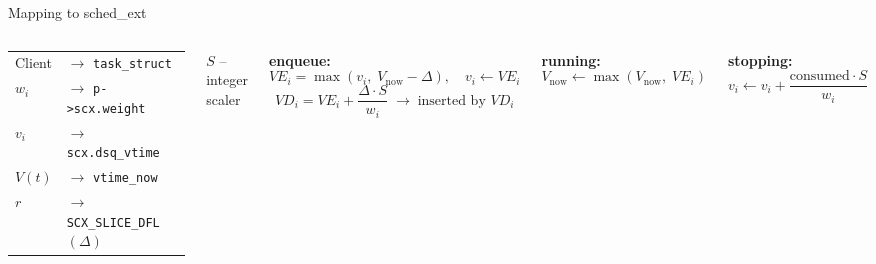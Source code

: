 \documentclass[aspectratio=169]{beamer}
\begin{document}
\begin{frame}{Mapping to sched\_ext}
        \begin{columns}
                \begin{tabular}{ll}
                        Client  & $\to$ \texttt{task\_struct} \\[2pt]
                        $w_i$   & $\to$ \texttt{p->scx.weight} \\[2pt]
                        $v_i$   & $\to$ \texttt{scx.dsq\_vtime} \\[2pt]
                        $V(t)$  & $\to$ \texttt{vtime\_now} \\[2pt]
                        $r$     & $\to$ \texttt{SCX\_SLICE\_DFL} $ ( \Delta ) $
                \end{tabular}

                \vspace{3.5em}
                {\footnotesize $ S $ --  integer scaler}
                
                \textbf{enqueue:}
                $$VE_i = \max(v_i,\; V_\mathrm{now} - \Delta),\quad v_i \leftarrow VE_i$$
                $$VD_i = VE_i + \frac{\Delta \cdot S}{w_i}
                \;\to\; \text{inserted by } VD_i$$

                \textbf{running:}
                $$V_\mathrm{now} \leftarrow \max(V_\mathrm{now},\; VE_i)$$

                \textbf{stopping:}
                $$v_i \leftarrow v_i +
                \frac{\mathrm{consumed}\cdot S}{w_i}$$
        \end{columns}
\end{frame}
\end{document}
